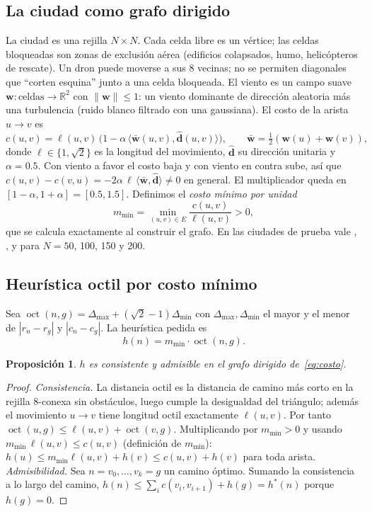 \documentclass[11pt]{article}
\newtheorem{prop}{Proposición}
\theoremstyle{remark}
\newcommand{\oct}{\operatorname{oct}}
\begin{document}
\subsection{La ciudad como grafo dirigido}
La ciudad es una rejilla $N\times N$. Cada celda libre es un vértice; las celdas bloqueadas son
zonas de exclusión aérea (edificios colapsados, humo, helicópteros de rescate). Un dron puede
moverse a sus 8 vecinas; no se permiten diagonales que ``corten esquina'' junto a una celda
bloqueada. El viento es un campo suave $\mathbf w:\text{celdas}\to\mathbb R^2$ con
$\|\mathbf w\|\le 1$: un viento dominante de dirección aleatoria más una turbulencia (ruido blanco
filtrado con una gaussiana). El costo de la arista $u\to v$ es
\begin{equation}\label{eq:costo}
  c(u,v)=\ell(u,v)\,\bigl(1-\alpha\,\langle \bar{\mathbf w}(u,v),\hat{\mathbf d}(u,v)\rangle\bigr),
  \qquad \bar{\mathbf w}=\tfrac12(\mathbf w(u)+\mathbf w(v)),
\end{equation}
donde $\ell\in\{1,\sqrt2\}$ es la longitud del movimiento, $\hat{\mathbf d}$ su dirección unitaria y
$\alpha=0.5$. Con viento a favor el costo baja y con viento en contra sube, así que
$c(u,v)-c(v,u)=-2\alpha\,\ell\,\langle\bar{\mathbf w},\hat{\mathbf d}\rangle\neq0$ en general. El
multiplicador queda en $[1-\alpha,1+\alpha]=[0.5,1.5]$. Definimos el \emph{costo mínimo por unidad}
\[
  m_{\min}=\min_{(u,v)\in E}\frac{c(u,v)}{\ell(u,v)}>0 ,
\]
que se calcula exactamente al construir el grafo. En las ciudades de prueba vale \mminA, \mminB,
\mminC{} y \mminD{} para $N=50$, 100, 150 y 200.

\subsection{Heurística octil por costo mínimo}
Sea $\oct(n,g)=\Delta_{\max}+(\sqrt2-1)\Delta_{\min}$ con $\Delta_{\max},\Delta_{\min}$ el mayor y el
menor de $|r_n-r_g|$ y $|c_n-c_g|$. La heurística pedida es
\begin{equation}\label{eq:h}
  h(n)=m_{\min}\cdot \oct(n,g).
\end{equation}

\begin{prop}\label{prop:h}
$h$ es consistente y admisible en el grafo dirigido de~\eqref{eq:costo}.
\end{prop}
\begin{proof}
\emph{Consistencia.} La distancia octil es la distancia de camino más corto en la rejilla
8-conexa sin obstáculos, luego cumple la desigualdad del triángulo; además el movimiento $u\to v$
tiene longitud octil exactamente $\ell(u,v)$. Por tanto $\oct(u,g)\le \ell(u,v)+\oct(v,g)$.
Multiplicando por $m_{\min}>0$ y usando $m_{\min}\,\ell(u,v)\le c(u,v)$ (definición de $m_{\min}$):
$h(u)\le m_{\min}\ell(u,v)+h(v)\le c(u,v)+h(v)$ para toda arista. \emph{Admisibilidad.} Sea
$n=v_0,\dots,v_k=g$ un camino óptimo. Sumando la consistencia a lo largo del camino,
$h(n)\le\sum_i c(v_i,v_{i+1})+h(g)=h^*(n)$ porque $h(g)=0$.
\end{proof}
\end{document}
